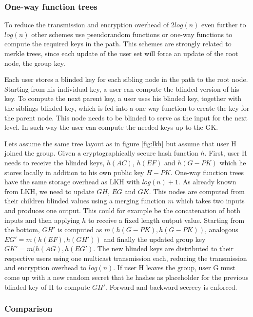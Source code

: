 \subsubsection{One-way function trees}
To reduce the transmission and encryption overhead of $2log(n)$ even further to $log(n)$ other schemes use pseudorandom functions \cite{canetti1999multicast} or one-way functions \cite{sherman2003key} to compute the required keys in the path. This schemes are strongly related to merkle trees, since each update of the user set will force an update of the root node, the group key.

Each user stores a blinded key for each sibling node in the path to the root node. Starting from his individual key, a user can compute the blinded version of his key. To compute the next parent key, a user uses his blinded key, together with the siblings blinded key, which is fed into a one way function to create the key for the parent node. This node needs to be blinded to serve as the input for the next level. In such way the user can compute the needed keys up to the GK. 

Lets assume the same tree layout as in figure \ref{fig:lkh} but assume that user H joined the group. Given a cryptographically secure hash function $h$. First, user H needs to receive the blinded keys, $h(AC)$, $h(EF)$ and $h(G-PK)$ which he stores locally in addition to his own public key $H-PK$. One-way function trees have the same storage overhead as LKH with $log(n) + 1$.  As already known from LKH, we need to update $GH$, $EG$ and $GK$. This nodes are computed from their children blinded values using a merging function $m$ which takes two inputs and produces one output. This could for example be the concatenation of both inputs and then applying $h$ to receive a fixed length output value. Starting from the bottom,  $GH'$ is computed as $m(h(G-PK), h(G-PK))$, analogous $EG' = m(h(EF), h(GH'))$ and finally the updated group key $GK' = m(h(AG), h(EG')$. The new blinded keys are distributed to their respective users using one multicast transmission each, reducing the transmission and encryption overhead to $log(n)$. If user H leaves the group, user G must come up with a new random secret that he hashes as placeholder for the previous blinded key of H to compute $GH'$. Forward and backward secrecy is enforced.


\subsubsection{Comparison}  

